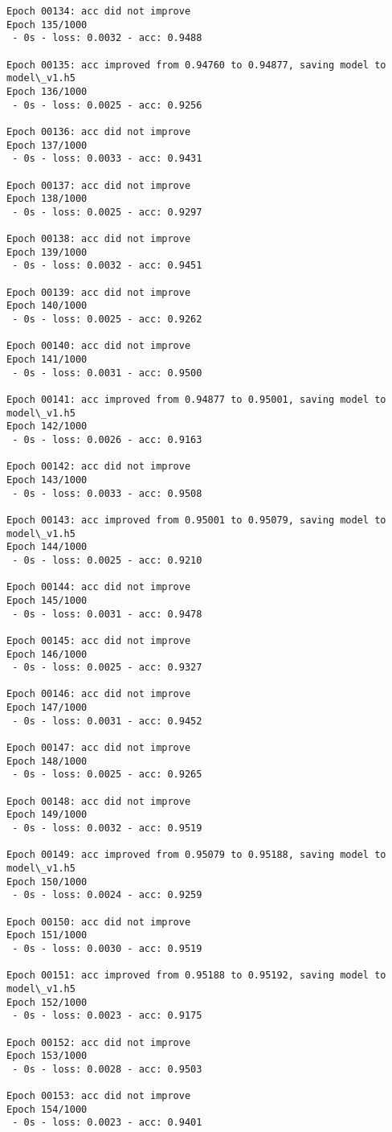\documentclass[11pt]{article}
\begin{document}
\begin{Verbatim}[commandchars=\\\{\}]
Epoch 00134: acc did not improve
Epoch 135/1000
 - 0s - loss: 0.0032 - acc: 0.9488

Epoch 00135: acc improved from 0.94760 to 0.94877, saving model to model\_v1.h5
Epoch 136/1000
 - 0s - loss: 0.0025 - acc: 0.9256

Epoch 00136: acc did not improve
Epoch 137/1000
 - 0s - loss: 0.0033 - acc: 0.9431

Epoch 00137: acc did not improve
Epoch 138/1000
 - 0s - loss: 0.0025 - acc: 0.9297

Epoch 00138: acc did not improve
Epoch 139/1000
 - 0s - loss: 0.0032 - acc: 0.9451

Epoch 00139: acc did not improve
Epoch 140/1000
 - 0s - loss: 0.0025 - acc: 0.9262

Epoch 00140: acc did not improve
Epoch 141/1000
 - 0s - loss: 0.0031 - acc: 0.9500

Epoch 00141: acc improved from 0.94877 to 0.95001, saving model to model\_v1.h5
Epoch 142/1000
 - 0s - loss: 0.0026 - acc: 0.9163

Epoch 00142: acc did not improve
Epoch 143/1000
 - 0s - loss: 0.0033 - acc: 0.9508

Epoch 00143: acc improved from 0.95001 to 0.95079, saving model to model\_v1.h5
Epoch 144/1000
 - 0s - loss: 0.0025 - acc: 0.9210

Epoch 00144: acc did not improve
Epoch 145/1000
 - 0s - loss: 0.0031 - acc: 0.9478

Epoch 00145: acc did not improve
Epoch 146/1000
 - 0s - loss: 0.0025 - acc: 0.9327

Epoch 00146: acc did not improve
Epoch 147/1000
 - 0s - loss: 0.0031 - acc: 0.9452

Epoch 00147: acc did not improve
Epoch 148/1000
 - 0s - loss: 0.0025 - acc: 0.9265

Epoch 00148: acc did not improve
Epoch 149/1000
 - 0s - loss: 0.0032 - acc: 0.9519

Epoch 00149: acc improved from 0.95079 to 0.95188, saving model to model\_v1.h5
Epoch 150/1000
 - 0s - loss: 0.0024 - acc: 0.9259

Epoch 00150: acc did not improve
Epoch 151/1000
 - 0s - loss: 0.0030 - acc: 0.9519

Epoch 00151: acc improved from 0.95188 to 0.95192, saving model to model\_v1.h5
Epoch 152/1000
 - 0s - loss: 0.0023 - acc: 0.9175

Epoch 00152: acc did not improve
Epoch 153/1000
 - 0s - loss: 0.0028 - acc: 0.9503

Epoch 00153: acc did not improve
Epoch 154/1000
 - 0s - loss: 0.0023 - acc: 0.9401


\end{Verbatim}
\end{document}
